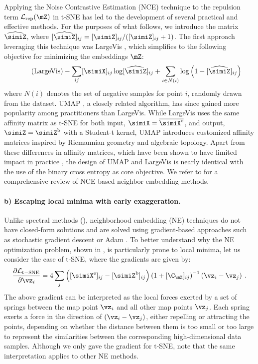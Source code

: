 Applying the Noise Contrastive Estimation (NCE) technique to the repulsion term $\mathcal{L}_{\mathrm{rep}}(\mZ)$ in t-SNE has led to the development of several practical and effective methods. For the purposes of what follows, we introduce the matrix $\widehat{\simiZ}$, where $[\widehat{\simiZ}]_{ij} = [\simiZ]_{ij} / ([\simiZ]_{ij} + 1)$. The first approach leveraging this technique was LargeVis \citep{tang2016visualizing}, which simplifies to the following objective for minimizing the embeddings $\mZ$:
\begin{align}\label{eq:LargeVis_pb}\tag{LargeVis}
    - \sum_{ij} [\simiX]_{ij} \log [\widehat{\simiZ}]_{ij} + \sum_{i \in N(i)} \log \left(1 - [\widehat{\simiZ}]_{ij}\right)
\end{align}
where $N(i)$ denotes the set of negative samples for point $i$, randomly drawn from the dataset. UMAP \citep{mcinnes2018umap}, a closely related algorithm, has since gained more popularity among practitioners than LargeVis. While LargeVis uses the same affinity matrix as t-SNE for both input, $ \simiX = \overline{\simiX^{\mathrm{e}}}$, and output, $ \simiZ = \simiZ^{\mathrm{b}}$ with a Student-t kernel, UMAP introduces customized affinity matrices inspired by Riemannian geometry and algebraic topology. Apart from these differences in affinity matrices, which have been shown to have limited impact in practice \citep{bohm2020unifying}, the design of UMAP and LargeVis is nearly identical with the use of the binary cross entropy as core objective. We refer to \citep{damrich2022t} for a comprehensive review of NCE-based neighbor embedding methods.


\paragraph{b) Escaping local minima with early exaggeration.} Unlike spectral methods (), neighborhood embedding (NE) techniques do not have closed-form solutions and are solved using gradient-based approaches such as stochastic gradient descent or Adam \citep{kingma2014adam}. To better understand why the NE optimization problem, shown in , is particularly prone to local minima, let us consider the case of t-SNE, where the gradients are given by:
\begin{align}
    \frac{\partial \mathcal{L}_{\mathrm{t-SNE}}}{\partial \vz_i} = 4 \sum_j \left( [\simiX^{\mathrm{e}}]_{ij} - [\simiZ^{\mathrm{b}}]_{ij} \right) \left(1 + [\C_{\mZ}]_{ij}\right)^{-1} \left( \vz_i - \vz_j \right) \:.
\end{align}
The above gradient can be interpreted as the local forces exerted by a set of springs between the map point $\vz_i$ and all other map points $\vz_j$. Each spring exerts a force in the direction of $(\vz_i - \vz_j)$, either repelling or attracting the points, depending on whether the distance between them is too small or too large to represent the similarities between the corresponding high-dimensional data samples. Although we only gave the gradient for t-SNE, note that the same interpretation applies to other NE methods.

